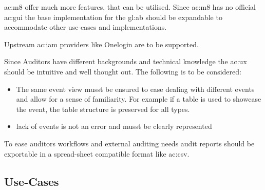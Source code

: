 \Gls{ac:m8} offer much more features, that can be utilised. Since \gls{ac:m8} has no official \gls{ac:gui} the base implementation for the \gls{gl:ab} should be expandable to accommodate other use-cases and implementations.

Upstream \gls{ac:iam} providers like Onelogin are to be supported.

Since Auditors have different backgrounds and technical knowledge the \gls{ac:ux} should be intuitive and well thought out. The following is to be considered:

\begin{itemize}
  \item The same event view musst be ensured to ease dealing with different events and allow for a sense of familiarity. For example if a table is used to showcase the event, the table structure is preserved for all types.
  \item lack of events is not an error and musst be clearly represented
\end{itemize}

To ease auditors workflows and external auditing needs audit reports should be exportable in a spread-sheet compatible format like \gls{ac:csv}.

\pagebreak

\subsection{Use-Cases}


